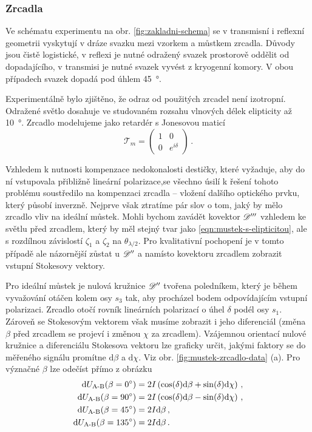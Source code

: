 \subsubsection*{Zrcadla}

Ve schématu experimentu na obr. \ref{fig:zakladni-schema} se v transmisní i reflexní geometrii vyskytují v dráze svazku mezi vzorkem a můstkem zrcadla.
Důvody jsou čistě logistické, v reflexi je nutné odražený svazek prostorově oddělit od dopadajícího, v transmisi je nutné svazek vyvést z kryogenní komory.
V obou případech svazek dopadá pod úhlem \SI{45}{\degree}.

Experimentálně bylo zjištěno, že odraz od použitých zrcadel není izotropní.
Odražené světlo dosahuje ve studovaném rozsahu vlnových délek elipticity až \SI{10}{\degree}.
Zrcadlo modelujeme jako retardér s Jonesovou maticí
\begin{equation}
    \mathcal{T}_m = \begin{pmatrix} 1&0\\0&e^{i\delta} \end{pmatrix} \,.
\end{equation}

Vzhledem k nutnosti kompenzace nedokonalosti destičky, které vyžaduje, aby do ní vstupovala přibližně lineární polarizace,se všechno úsilí k řešení tohoto problému soustředilo na kompenzaci zrcadla -- vložení dalšího optického prvku, který působí inverzně.
Nejprve však ztratíme pár slov o tom, jaký by mělo zrcadlo vliv na ideální můstek.
Mohli bychom zavádět kovektor $\mathscr{D}'''$ vzhledem ke světlu před zrcadlem, který by měl stejný tvar jako \eqref{eqn:mustek-s-elipticitou}, ale s rozdílnou závislostí $\zeta_1$ a $\zeta_2$ na $\theta_{\lambda/2}$.
Pro kvalitativní pochopení je v tomto případě ale názornější zůstat u $\mathscr{D}''$ a namísto kovektoru zrcadlem zobrazit vstupní Stokesovy vektory.

Pro ideální můstek je nulová kružnice $\mathscr{D}''$ tvořena poledníkem, který je během vyvažování otáčen kolem osy $s_3$ tak, aby procházel bodem odpovídajícím vstupní polarizaci.
Zrcadlo otočí rovník lineárních polarizací o úhel $\delta$ podél osy $s_1$.
Zároveň se Stokesovým vektorem však musíme zobrazit i jeho diferenciál (změna $\beta$ před zrcadlem se projeví i změnou $\chi$ za zrcadlem).
Vzájemnou orientací nulové kružnice a diferenciálu Stokesova vektoru lze graficky určit, jakými faktory se do měřeného signálu promítne $\textrm{d}\beta$ a $\textrm{d}\chi$.
Viz obr. \ref{fig:mustek-zrcadlo-data} (a).
Pro význačné $\beta$ lze odečíst přímo z obrázku
\begin{align}
    \textrm{d}U_\textrm{A-B}(\beta=\SI{0}{\degree}) &= 2I\left(\cos(\delta)\textrm{d}\beta + \sin(\delta)\textrm{d}\chi\right) \,,\\
    \textrm{d}U_\textrm{A-B}(\beta=\SI{90}{\degree}) &= 2I\left(\cos(\delta)\textrm{d}\beta - \sin(\delta)\textrm{d}\chi\right) \,,\\
    \textrm{d}U_\textrm{A-B}(\beta=\SI{45}{\degree}) &= 2I\textrm{d}\beta \,, \label{eqn:must-zrc-1}\\
    \textrm{d}U_\textrm{A-B}(\beta=\SI{135}{\degree}) &= 2I\textrm{d}\beta \,. \label{eqn:must-zrc-2}
\end{align}

